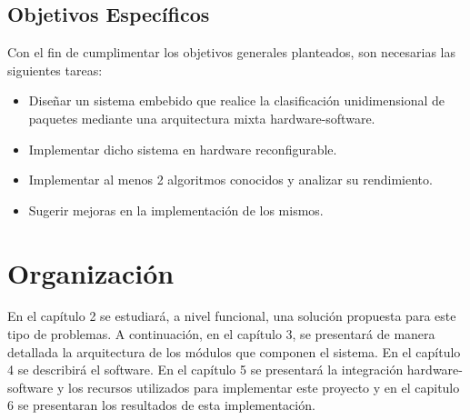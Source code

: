 \subsection{Objetivos Específicos}
Con el fin de cumplimentar los objetivos generales planteados, son necesarias las siguientes tareas:

    \begin{itemize}     

     	\item Diseñar un sistema embebido que realice la clasificación unidimensional de paquetes mediante una arquitectura mixta hardware-software.
	\item Implementar dicho sistema en hardware reconfigurable.
	\item Implementar al menos 2 algoritmos conocidos y analizar su rendimiento.
	\item Sugerir mejoras en la implementación de los mismos.

\end{itemize}


\section{Organización}

En el capítulo 2 se estudiará, a nivel funcional, una solución propuesta para este tipo de problemas. A continuación, en el capítulo 3, se presentará de manera detallada la arquitectura de los módulos que componen el sistema. En el capítulo 4 se describirá el software. En el capítulo 5 se presentará la integración hardware-software y los recursos utilizados para implementar este proyecto y en el capitulo 6 se presentaran los resultados de esta implementación.






